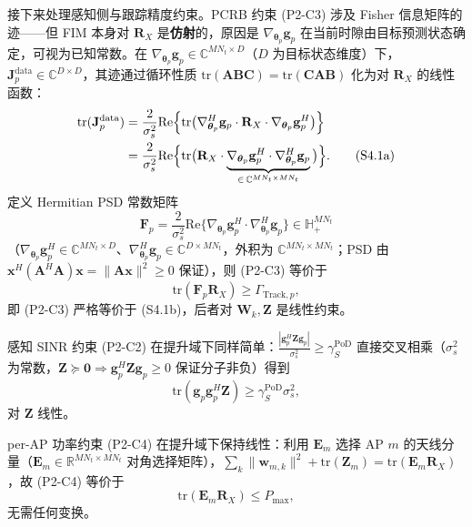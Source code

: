 \documentclass[12pt,a4paper]{article}
\newcommand{\vect}[1]{\mathbf{#1}}
\newcommand{\mat}[1]{\mathbf{#1}}
\newcommand{\tr}{\text{tr}}
\newcommand{\Real}{\text{Re}}
\begin{document}
接下来处理感知侧与跟踪精度约束。PCRB 约束 (P2-C3) 涉及 Fisher 信息矩阵的迹——但 FIM 本身对 $\mat{R}_X$ 是\textbf{仿射}的，原因是 $\nabla_{\boldsymbol{\theta}_p} \vect{g}_p$ 在当前时隙由目标预测状态确定，可视为已知常数。在 $\nabla_{\boldsymbol{\theta}_p} \vect{g}_p \in \mathbb{C}^{MN_t \times D}$（$D$ 为目标状态维度）下，$\mat{J}_p^{\text{data}} \in \mathbb{C}^{D\times D}$，其迹通过循环性质 $\tr(\mat{A}\mat{B}\mat{C}) = \tr(\mat{C}\mat{A}\mat{B})$ 化为对 $\mat{R}_X$ 的线性函数：
\begin{align}
\tr(\mat{J}_p^{\text{data}}) &= \frac{2}{\sigma_s^2} \Real\Big\{ \tr\big(\nabla_{\boldsymbol{\theta}_p}^H \vect{g}_p \cdot \mat{R}_X \cdot \nabla_{\boldsymbol{\theta}_p} \vect{g}_p^H\big) \Big\} \notag \\
&= \frac{2}{\sigma_s^2} \Real\Big\{ \tr\big(\mat{R}_X \cdot \underbrace{\nabla_{\boldsymbol{\theta}_p} \vect{g}_p^H \cdot \nabla_{\boldsymbol{\theta}_p}^H \vect{g}_p}_{\in\, \mathbb{C}^{MN_t \times MN_t}}\big) \Big\}. \tag{S4.1a}
\end{align}
定义 Hermitian PSD 常数矩阵
$$
\mat{F}_p = \frac{2}{\sigma_s^2} \Real\{\nabla_{\boldsymbol{\theta}_p} \vect{g}_p^H \cdot \nabla_{\boldsymbol{\theta}_p}^H \vect{g}_p\} \in \mathbb{H}_+^{MN_t}
$$
（$\nabla_{\boldsymbol{\theta}_p} \vect{g}_p^H \in \mathbb{C}^{MN_t \times D}$、$\nabla_{\boldsymbol{\theta}_p}^H \vect{g}_p \in \mathbb{C}^{D \times MN_t}$，外积为 $\mathbb{C}^{MN_t \times MN_t}$；PSD 由 $\vect{x}^H(\mat{A}^H\mat{A})\vect{x} = \|\mat{A}\vect{x}\|^2 \geq 0$ 保证），则 (P2-C3) 等价于
\begin{equation}
\tr(\mat{F}_p \mat{R}_X) \geq \Gamma_{\text{Track},p}, \tag{S4.1b}
\end{equation}
即 (P2-C3) 严格等价于 (S4.1b)，后者对 $\mat{W}_k, \mat{Z}$ 是线性约束。

感知 SINR 约束 (P2-C2) 在提升域下同样简单：$\frac{|\vect{g}_p^H \mat{Z} \vect{g}_p|}{\sigma_s^2} \geq \gamma_S^{\text{PoD}}$ 直接交叉相乘（$\sigma_s^2$ 为常数，$\mat{Z} \succeq \mat{0} \Rightarrow \vect{g}_p^H \mat{Z} \vect{g}_p \geq 0$ 保证分子非负）得到
\begin{equation}
\tr(\vect{g}_p \vect{g}_p^H \mat{Z}) \geq \gamma_S^{\text{PoD}} \sigma_s^2, \tag{S4.2}
\end{equation}
对 $\mat{Z}$ 线性。

per-AP 功率约束 (P2-C4) 在提升域下保持线性：利用 $\mat{E}_m$ 选择 AP $m$ 的天线分量（$\mat{E}_m \in \mathbb{R}^{MN_t \times MN_t}$ 对角选择矩阵），$\sum_k \|\vect{w}_{m,k}\|^2 + \tr(\mat{Z}_m) = \tr(\mat{E}_m \mat{R}_X)$，故 (P2-C4) 等价于
\begin{equation}
\tr(\mat{E}_m \mat{R}_X) \leq P_{\max}, \tag{S5.1}
\end{equation}
无需任何变换。
\end{document}
